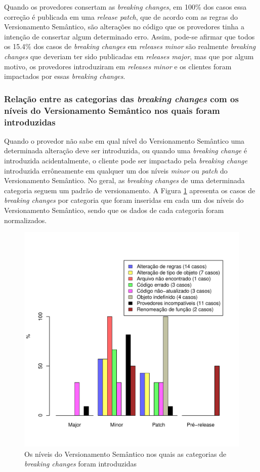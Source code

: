 Quando os provedores consertam as \textit{breaking changes}, em 100\% dos casos essa correção é publicada em uma \textit{release patch}, que de acordo com as regras do Versionamento Semântico, são alterações no código que os provedores tinha a intenção de consertar algum determinado erro. Assim, pode-se afirmar que todos os 15.4\% dos casos de \textit{breaking changes} em \textit{releases minor} são realmente \textit{breaking changes} que deveriam ter sido publicadas em \textit{releases major}, mas que por algum motivo, os provedores introduziram em \textit{releases minor} e os clientes foram impactados por essas \textit{breaking changes}.

\subsubsection{Relação entre as categorias das \textit{breaking changes} com os níveis do Versionamento Semântico nos quais foram introduzidas}


Quando o provedor não sabe em qual nível do Versionamento Semântico uma determinada alteração deve ser introduzida, ou quando uma \textit{breaking change} é introduzida acidentalmente, o cliente pode ser impactado pela \textit{breaking change} introduzida  errôneamente em qualquer um dos níveis \textit{minor} ou \textit{patch} do Versionamento Semântico. No geral, as \textit{breaking changes} de uma determinada categoria seguem um padrão de versionamento. A Figura \ref{fig:semver_types} apresenta os casos de \textit{breaking changes} por categoria que foram inseridas em cada um dos níveis do Versionamento Semântico, sendo que os dados de cada categoria foram normalizados. 

\begin{figure}[!h]
	\centering
	\includegraphics[scale=0.65]{figuras/semver_types.pdf}
	\caption{Os níveis do Versionamento Semântico nos quais as categorias de \textit{breaking changes} foram introduzidas}
	\label{fig:semver_types}
\end{figure}{}


